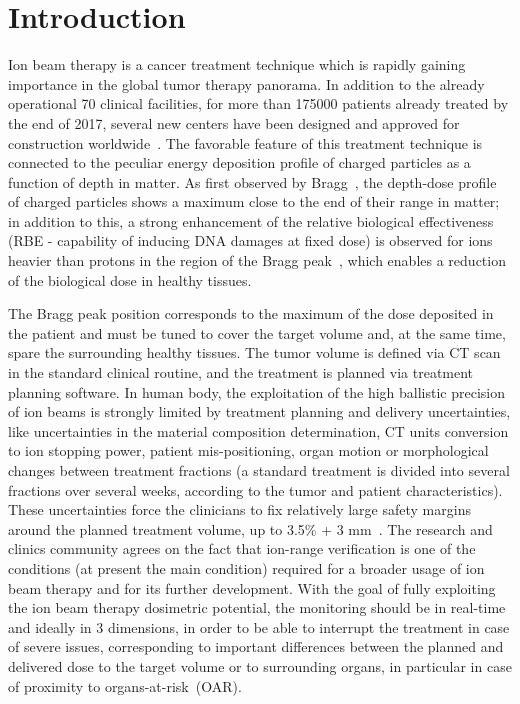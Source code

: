 \section{Introduction}\label{section::Intro}
Ion beam therapy is a cancer treatment technique which is rapidly gaining importance in the global tumor therapy panorama. In addition to the already operational 70 clinical facilities, for more than 175000 patients already treated by the end of 2017, several new centers have been designed and approved for construction worldwide~\cite{PTCOG_stats}. The favorable feature of this treatment technique is connected to the peculiar energy deposition profile of charged particles as a function of depth in matter. As first observed by Bragg~\cite{Bragg_main}, the depth-dose profile of charged particles shows a maximum close to the end of their range in matter; in addition to this, a strong enhancement of the relative biological effectiveness (RBE - capability of inducing DNA damages at fixed dose) is observed for ions heavier than protons in the region of the Bragg peak~\cite{RBE_Elsasser, RBE_Weyrather}, which enables a reduction of the biological dose in healthy tissues.

The Bragg peak position corresponds to the maximum of the dose deposited in the patient and must be tuned to cover the target volume and, at the same time, spare the surrounding healthy tissues. The tumor volume is defined via CT scan in the standard clinical routine, and the treatment is planned via treatment planning software. In human body, the exploitation of the high ballistic precision of ion beams is strongly limited by treatment planning and delivery uncertainties, like uncertainties in the material composition determination, CT units conversion to ion stopping power, patient mis-positioning, organ motion or morphological changes between treatment fractions (a standard treatment is divided into several fractions over several weeks, according to the tumor and patient characteristics). These uncertainties force the clinicians to fix relatively large safety margins around the planned treatment volume, up to 3.5\% + 3 mm~\cite{Paganetti:2012aa}. The research and clinics community agrees on the fact that ion-range verification is one of the conditions (at present the main condition) required for a broader usage of ion beam therapy and for its further development. With the goal of fully exploiting the ion beam therapy dosimetric potential, the monitoring should be in real-time and ideally in 3 dimensions, in order to be able to interrupt the treatment in case of severe issues, corresponding to important differences between the planned and delivered dose to the target volume or to surrounding organs, in particular in case of proximity to organs-at-risk~(OAR).

